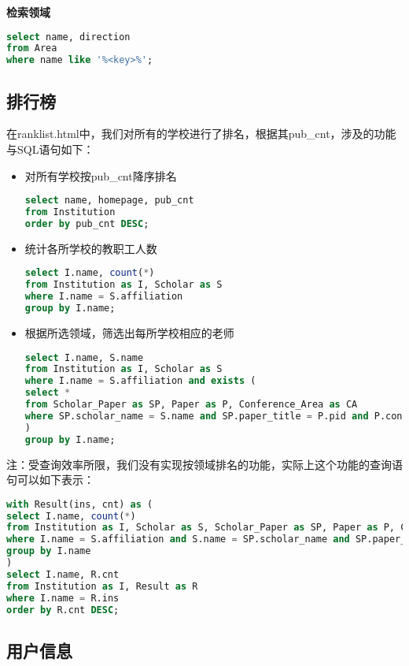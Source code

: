 {\bf 检索领域}
\begin{lstlisting}[language=SQL]
select name, direction
from Area
where name like '%<key>%';
\end{lstlisting}


\subsection{排行榜}

在ranklist.html中，我们对所有的学校进行了排名，根据其pub\_cnt，涉及的功能与SQL语句如下：
\begin{itemize}
\item 对所有学校按pub\_cnt降序排名
\begin{lstlisting}[language=SQL]
select name, homepage, pub_cnt
from Institution
order by pub_cnt DESC;
\end{lstlisting}
\item 统计各所学校的教职工人数
\begin{lstlisting}[language=SQL]
select I.name, count(*)
from Institution as I, Scholar as S
where I.name = S.affiliation
group by I.name;
\end{lstlisting}
\item 根据所选领域，筛选出每所学校相应的老师
\begin{lstlisting}[language=SQL]
select I.name, S.name
from Institution as I, Scholar as S
where I.name = S.affiliation and exists (
select *
from Scholar_Paper as SP, Paper as P, Conference_Area as CA
where SP.scholar_name = S.name and SP.paper_title = P.pid and P.conf_id = CA.conf_id and CA.area in :area_list
)
group by I.name;
\end{lstlisting}
\end{itemize}
注：受查询效率所限，我们没有实现按领域排名的功能，实际上这个功能的查询语句可以如下表示：
\begin{lstlisting}[language=SQL]
with Result(ins, cnt) as (
select I.name, count(*)
from Institution as I, Scholar as S, Scholar_Paper as SP, Paper as P, Conferece_Area as CA
where I.name = S.affiliation and S.name = SP.scholar_name and SP.paper_title = P.pid and P.conf_id = CA.conf_id and CA.area in :area_list
group by I.name
)
select I.name, R.cnt
from Institution as I, Result as R
where I.name = R.ins
order by R.cnt DESC;
\end{lstlisting}

\subsection{用户信息}


